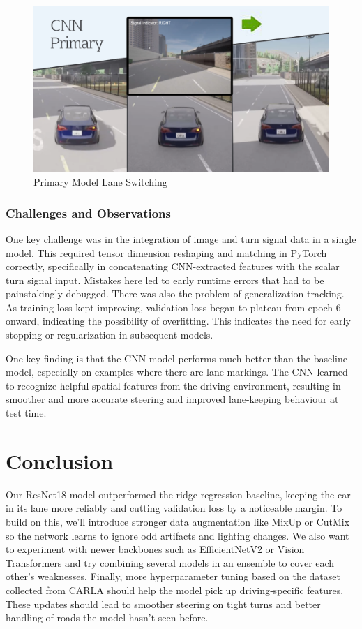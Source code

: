 \documentclass{article} %
\begin{document}
\begin{figure}[H] %
    \centering
    \includegraphics[width=1.0\textwidth]{primary.png} %
    \caption{Primary Model Lane Switching}
    \label{fig:primary}
\end{figure}


\subsubsection{Challenges and Observations}

One key challenge was in the integration of image and turn signal data in a single model. This required tensor dimension reshaping and matching in PyTorch correctly, specifically in concatenating CNN-extracted features with the scalar turn signal input. Mistakes here led to early runtime errors that had to be painstakingly debugged.
There was also the problem of generalization tracking. As training loss kept improving, validation loss began to plateau from epoch 6 onward, indicating the possibility of overfitting. This indicates the need for early stopping or regularization in subsequent models.


One key finding is that the CNN model performs much better than the baseline model, especially on examples where there are lane markings. The CNN learned to recognize helpful spatial features from the driving environment, resulting in smoother and more accurate steering and improved lane-keeping behaviour at test time. 

\section{Conclusion}

Our ResNet18 model outperformed the ridge regression baseline, keeping the car in its lane more reliably and 
cutting validation loss by a noticeable margin. To build on this, we’ll introduce stronger data augmentation like MixUp or 
CutMix so the network learns to ignore odd artifacts and lighting changes. We also want to experiment with newer backbones 
such as EfficientNetV2 or Vision Transformers and try combining several models in an ensemble to cover each other’s weaknesses. 
Finally, more hyperparameter tuning based on the dataset collected from CARLA should help the model pick up 
driving‑specific features. 
These updates should lead to smoother steering on tight turns and better handling of roads the model hasn’t seen before.
\label{last_page}
\end{document}
